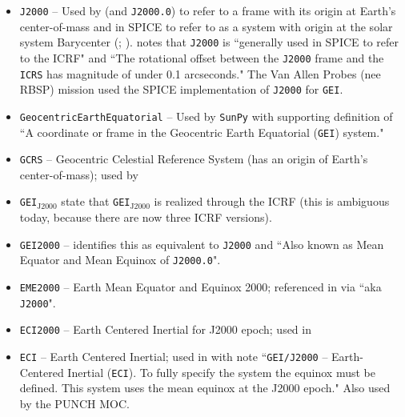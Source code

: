 \documentclass[draft]{agujournal2019}
\begin{document}
\begin{itemize}
    \parskip 0.1in 

    \item \texttt{J2000} -- Used by  (and \texttt{J2000.0}) to refer to a frame with its origin at Earth's center-of-mass and in SPICE to refer to as a system with origin at the solar system Barycenter (; ).  notes that \texttt{J2000} is ``generally used in SPICE to refer to the ICRF" and ``The rotational offset between the \texttt{J2000} frame and the \texttt{ICRS} has magnitude of under 0.1 arcseconds." The Van Allen Probes (nee RBSP) mission used the SPICE implementation of \texttt{J2000} for \texttt{GEI}.


    \item \texttt{GeocentricEarthEquatorial} -- Used by \texttt{SunPy} with supporting definition of ``A coordinate or frame in the Geocentric Earth Equatorial (\texttt{GEI}) system."
    
    \item \texttt{GCRS} -- Geocentric Celestial Reference System (has an origin of Earth's center-of-mass); used by 

    \item \texttt{GEI}$_\mathrm{J2000}$  state that \texttt{GEI}$_\mathrm{J2000}$ is realized through the ICRF (this is ambiguous today, because there are now three ICRF versions).

    \item \texttt{GEI2000} --  identifies this as equivalent to \texttt{J2000} and ``Also known as Mean Equator and Mean Equinox of \texttt{J2000.0}". 

    \item \texttt{EME2000} -- Earth Mean Equator and Equinox 2000; referenced in  via ``aka \texttt{J2000}".

    \item \texttt{ECI2000} -- Earth Centered Inertial for J2000 epoch; used in \cite{Niehof2022}

    \item \texttt{ECI} -- Earth Centered Inertial; used in  with note ``\texttt{GEI/J2000} – Earth-Centered Inertial (\texttt{ECI}). To fully specify the system the equinox must be defined. This system uses the mean equinox at the J2000 epoch." Also used by the PUNCH MOC.


\end{itemize}
\end{document}
